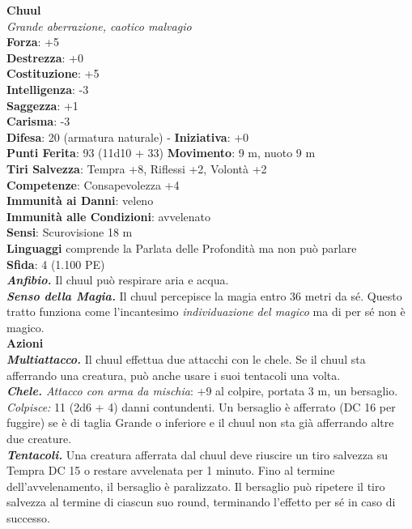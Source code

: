 \begin{multicols}{2}
\medskip\textbf{Chuul}\\
\emph{Grande aberrazione, caotico malvagio}\\
\textbf{Forza}: +5\\
\textbf{Destrezza}: +0\\
\textbf{Costituzione}: +5\\
\textbf{Intelligenza}: -3\\
\textbf{Saggezza}: +1\\
\textbf{Carisma}: -3\\
\textbf{Difesa}: 20 (armatura naturale) - \textbf{Iniziativa}: +0\\
\textbf{Punti Ferita}: 93 (11d10 + 33)
\textbf{Movimento}: 9 m, nuoto 9 m\\
\textbf{Tiri Salvezza}: Tempra +8, Riflessi +2, Volontà +2\\
\textbf{Competenze}: Consapevolezza +4\\
\textbf{Immunità ai Danni}: veleno\\
\textbf{Immunità alle Condizioni}: avvelenato\\
\textbf{Sensi}: Scurovisione 18 m\\
\textbf{Linguaggi} comprende la Parlata delle Profondità ma non può parlare\\
\textbf{Sfida}: 4 (1.100 PE)\smallskip\\
\emph{\textbf{Anfibio.}} Il chuul può respirare aria e acqua.\\
\emph{\textbf{Senso della Magia.}} Il chuul percepisce la magia entro 36 metri da sé. Questo tratto funziona come l'incantesimo \emph{individuazione} \emph{del magico} ma di per sé non è magico.\\
\smallskip\textbf{Azioni}\\
\emph{\textbf{Multiattacco.}} Il chuul effettua due attacchi con le chele. Se il chuul sta afferrando una creatura, può anche usare i suoi tentacoli una volta.\\
\emph{\textbf{Chele.} Attacco con arma da mischia}: +9 al colpire, portata 3 m, un bersaglio.\\
\emph{Colpisce:} 11 (2d6 + 4) danni contundenti. Un bersaglio è afferrato (DC  16 per fuggire) se è di taglia Grande o inferiore e il chuul non sta già afferrando altre due creature.\\
\emph{\textbf{Tentacoli.}} Una creatura afferrata dal chuul deve riuscire un tiro salvezza su Tempra DC  15 o restare avvelenata per 1 minuto. Fino al termine dell'avvelenamento, il bersaglio è paralizzato. Il bersaglio può ripetere il tiro salvezza al termine di ciascun suo round, terminando l'effetto per sé in caso di successo.\\

\end{multicols}
